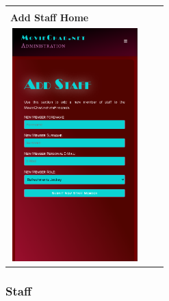 \documentclass[11pt, english]{article}
\begin{document}
\begin{center}
\begin{longtable}{p{5cm}p{5cm}p{5cm}}
		& \\
                \textbf{Add Staff Home}\\
		\includegraphics[width=5cm,height=9cm]{CS993_IMG/staff3.png}\\
        \end{longtable}
        \end{center}

\newpage

		\subsubsection{Staff}
		
\end{document}
